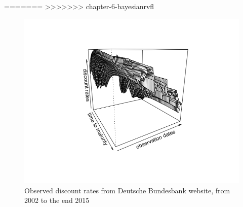 =======
>>>>>>> chapter-6-bayesianrvfl
\begin{figure}[!htb]
\centering
\includegraphics[width=14cm]{gfx/chapter-krls-models/bundesbank_dR.png}
\caption{Observed discount rates from Deutsche Bundesbank website, from 2002 to the end 2015}
\label{db_zerorates}
\end{figure}

